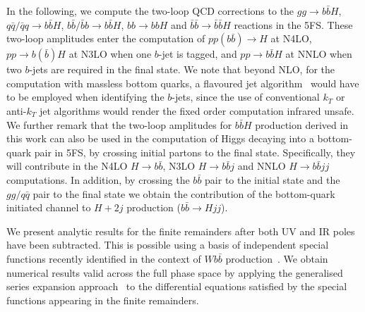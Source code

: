 \documentclass[main.tex]{subfiles}
\begin{document}
In the following, we compute the two-loop QCD corrections to the $gg \rightarrow b\bar{b}H$,
$q\bar{q}/\bar{q}q \rightarrow b\bar{b}H$, $b\bar{b}/\bar{b}b\rightarrow b\bar{b}H$, $bb \rightarrow
bbH$ and $\bar{b}\bar{b}\rightarrow\bar{b}\bar{b}H$ reactions in the 5FS. These two-loop amplitudes
enter the computation of $pp(b\bar{b})\to H$ at N4LO, $pp\to b(\bar{b})H$ at N3LO when one $b$-jet
is tagged, and $pp\to b\bar{b}H$ at NNLO when two $b$-jets are required in the final state.  We note
that beyond NLO, for the computation with massless bottom quarks, a flavoured jet
algorithm~\cite{Banfi:2006hf} would have to be employed when identifying the $b$-jets, since the use
of conventional $k_T$ or anti-$k_T$ jet algorithms would render the fixed order computation infrared
unsafe.  We further remark that the two-loop amplitudes for $b\bar{b}H$ production derived in this
work can also be used in the computation of Higgs decaying into a bottom-quark pair in 5FS, by
crossing initial partons to the final state. Specifically, they will contribute in the N4LO $H\to
b\bar{b}$, N3LO $H\to b\bar{b}j$ and NNLO $H\to b\bar{b}jj$ computations.  In addition, by crossing
the $b\bar{b}$ pair to the initial state and the $gg/q\bar{q}$ pair to the final state we obtain the
contribution of the bottom-quark initiated channel to $H+2j$ production ($b\bar{b}\to Hjj$).

We present analytic results for the finite remainders after both UV and IR poles have been subtracted. This is possible using a basis of independent special functions recently identified in the context
of $Wb\bar{b}$ production~\cite{Badger:2021nhg}. We obtain numerical results valid across the full phase
space by applying the generalised series expansion approach~\cite{Francesco:2019yqt,Abreu:2020jxa,Hidding:2020ytt} to the differential equations satisfied by the special functions appearing in the finite remainders.
\end{document}
